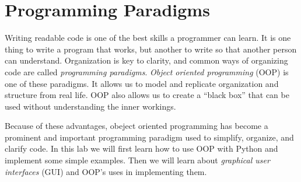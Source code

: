 \label{lab:OOP}

\section*{Programming Paradigms}

Writing readable code is one of the best skills a programmer can learn.
It is one thing to write a program that works, but another to write so that another person can understand.
Organization is key to clarity, and common ways of organizing code are called \emph{programming paradigms}.
\emph{Object oriented programming} (OOP) is one of these paradigms.
It allows us to model and replicate organization and structure from real life.
OOP also allows us to create a ``black box'' that can be used without understanding the inner workings.

Because of these advantages, obeject oriented programming has become a prominent and important programming paradigm used to simplify, organize, and clarify code. 
In this lab we will first learn how to use OOP with Python and implement some simple examples. 
Then we will learn about \emph{graphical user interfaces} (GUI) and OOP's uses in implementing them.


\begin{comment}
A way of organizing a program is often called a ``paradigm."

Paradigms are designed to create better code by structuring or organizing the code in a more meaningful way.
Code without any structure is often referred to as ``spaghetti code.''
Spaghetti can be very easy to write, but very difficult to understand or modify.
\emph{Structured programming} emphasizes the use of programming structures to select or repeat the execution of blocks of code.
It is good practice to structure your programs in such a way that they are easy to understand, extend, or reuse.
Making extensive use of procedures (or subfunctions) is a characteristic of \emph{procedural programming}.
The work of the program is done in the subfunctions with one main function supervising the calling of each subfunction.

Another important, albeit specialized, paradigm is \li{object oriented programming} (or OOP).
The concept of object oriented programming is to model a problem as the interaction of a collection of objects.
There are many other paradigms such as declarative, event-driven, and array programming.
\end{comment}



